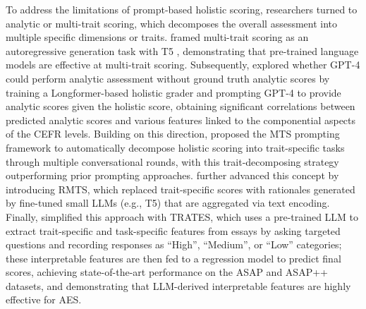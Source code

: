 \documentclass{report}
\begin{document}
To address the limitations of prompt-based holistic scoring, researchers turned to analytic or multi-trait scoring, which decomposes the overall assessment into multiple specific dimensions or traits. \citet{do2024autoregressivescoregenerationmultitrait} framed multi-trait scoring as an autoregressive generation task with T5 \citep{raffel2023exploringlimitstransferlearning}, demonstrating that pre-trained language models are effective at multi-trait scoring. Subsequently, \citet{banno-etal-2024-gpt} explored whether GPT-4 could perform analytic assessment without ground truth analytic scores by training a Longformer-based \citep{beltagy2020longformerlongdocumenttransformer} holistic grader and prompting GPT-4 to provide analytic scores given the holistic score, obtaining significant correlations between predicted analytic scores and various features linked to the componential aspects of the CEFR levels. Building on this direction, \citet{lee2024unleashinglargelanguagemodels} proposed the \textsc{MTS} prompting framework to automatically decompose holistic scoring into trait-specific tasks through multiple conversational rounds, with this trait-decomposing strategy outperforming prior prompting approaches. \citet{chu2025rationaleessayscoresenhancing} further advanced this concept by introducing \textsc{RMTS}, which replaced trait-specific scores with rationales generated by fine-tuned small LLMs (e.g., T5) that are aggregated via text encoding. Finally, \citet{eltanbouly2025tratestraitspecificrubricassistedcrossprompt} simplified this approach with \textsc{TRATES}, which uses a pre-trained LLM to extract trait-specific and task-specific features from essays by asking targeted questions and recording responses as ``High'', ``Medium'', or ``Low'' categories; these interpretable features are then fed to a regression model to predict final scores, achieving state-of-the-art performance on the ASAP and ASAP++ datasets, and demonstrating that LLM-derived interpretable features are highly effective for AES.
\end{document}
